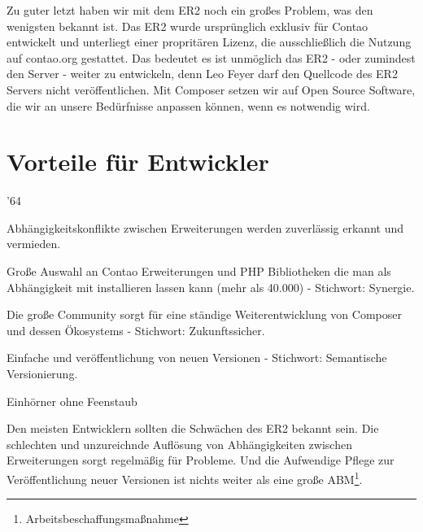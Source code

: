 \documentclass[
paper=a4,
draft=false,%
fontsize=10pt%
]{scrartcl}
\begin{document}
Zu guter letzt haben wir mit dem ER2 noch ein großes Problem, was den wenigsten bekannt ist. Das ER2 wurde ursprünglich exklusiv für Contao entwickelt und unterliegt einer propritären Lizenz, die ausschließlich die Nutzung auf contao.org gestattet. Das bedeutet es ist unmöglich das ER2 - oder zumindest den Server - weiter zu entwickeln, denn Leo Feyer darf den Quellcode des ER2 Servers nicht veröffentlichen. Mit Composer setzen wir auf Open Source Software, die wir an unsere Bedürfnisse anpassen können, wenn es notwendig wird.

\newpage

%
%

\section{Vorteile für Entwickler}
\label{sec:pros-for-developers}

\begin{minipage}{.02\linewidth}
\end{minipage}
\begin{minipage}{.98\linewidth}
  \begin{dinglist}{'64}
  \item Abhängigkeitskonflikte zwischen Erweiterungen werden zuverlässig erkannt und vermieden.
  \item Große Auswahl an Contao Erweiterungen und PHP Bibliotheken die man als Abhängigkeit mit installieren lassen kann (mehr als 40.000) - Stichwort: Synergie.
  \item Die große Community sorgt für eine ständige Weiterentwicklung von Composer und dessen Ökosystems - Stichwort: Zukunftssicher.
  \item Einfache und  veröffentlichung von neuen Versionen - Stichwort: Semantische Versionierung.
  \item Einhörner ohne Feenstaub
  \end{dinglist}
\end{minipage}

Den meisten Entwicklern sollten die Schwächen des ER2 bekannt sein. Die schlechten und unzureichnde Auflösung von Abhängigkeiten zwischen Erweiterungen sorgt regelmäßig für Probleme. Und die Aufwendige Pflege zur Veröffentlichung neuer Versionen ist nichts weiter als eine große ABM\footnote{Arbeitsbeschaffungsmaßnahme}.
\end{document}
